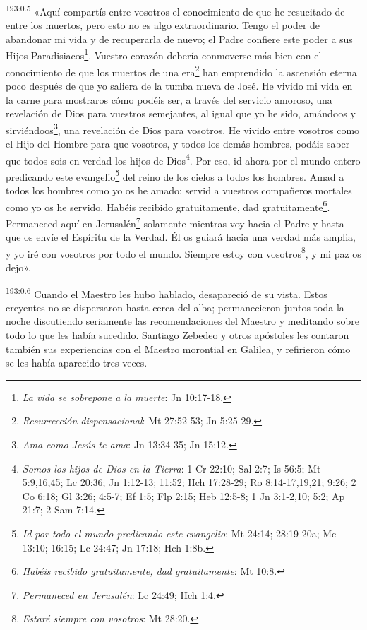 \par
\textsuperscript{193:0.5} «Aquí compartís entre vosotros el conocimiento de que he resucitado de entre los muertos, pero esto no es algo extraordinario. Tengo el poder de abandonar mi vida y de recuperarla de nuevo; el Padre confiere este poder a sus Hijos Paradisiacos\footnote{\textit{La vida se sobrepone a la muerte}: Jn 10:17-18.}. Vuestro corazón debería conmoverse más bien con el conocimiento de que los muertos de una era\footnote{\textit{Resurrección dispensacional}: Mt 27:52-53; Jn 5:25-29.} han emprendido la ascensión eterna poco después de que yo saliera de la tumba nueva de José. He vivido mi vida en la carne para mostraros cómo podéis ser, a través del servicio amoroso, una revelación de Dios para vuestros semejantes, al igual que yo he sido, amándoos y sirviéndoos\footnote{\textit{Ama como Jesús te ama}: Jn 13:34-35; Jn 15:12.}, una revelación de Dios para vosotros. He vivido entre vosotros como el Hijo del Hombre para que vosotros, y todos los demás hombres, podáis saber que todos sois en verdad los hijos de Dios\footnote{\textit{Somos los hijos de Dios en la Tierra}: 1 Cr 22:10; Sal 2:7; Is 56:5; Mt 5:9,16,45; Lc 20:36; Jn 1:12-13; 11:52; Hch 17:28-29; Ro 8:14-17,19,21; 9:26; 2 Co 6:18; Gl 3:26; 4:5-7; Ef 1:5; Flp 2:15; Heb 12:5-8; 1 Jn 3:1-2,10; 5:2; Ap 21:7; 2 Sam 7:14.}. Por eso, id ahora por el mundo entero predicando este evangelio\footnote{\textit{Id por todo el mundo predicando este evangelio}: Mt 24:14; 28:19-20a; Mc 13:10; 16:15; Lc 24:47; Jn 17:18; Hch 1:8b.} del reino de los cielos a todos los hombres. Amad a todos los hombres como yo os he amado; servid a vuestros compañeros mortales como yo os he servido. Habéis recibido gratuitamente, dad gratuitamente\footnote{\textit{Habéis recibido gratuitamente, dad gratuitamente}: Mt 10:8.}. Permaneced aquí en Jerusalén\footnote{\textit{Permaneced en Jerusalén}: Lc 24:49; Hch 1:4.} solamente mientras voy hacia el Padre y hasta que os envíe el Espíritu de la Verdad. Él os guiará hacia una verdad más amplia, y yo iré con vosotros por todo el mundo. Siempre estoy con vosotros\footnote{\textit{Estaré siempre con vosotros}: Mt 28:20.}, y mi paz os dejo».

\par
\textsuperscript{193:0.6} Cuando el Maestro les hubo hablado, desapareció de su vista. Estos creyentes no se dispersaron hasta cerca del alba; permanecieron juntos toda la noche discutiendo seriamente las recomendaciones del Maestro y meditando sobre todo lo que les había sucedido. Santiago Zebedeo y otros apóstoles les contaron también sus experiencias con el Maestro morontial en Galilea, y refirieron cómo se les había aparecido tres veces.

